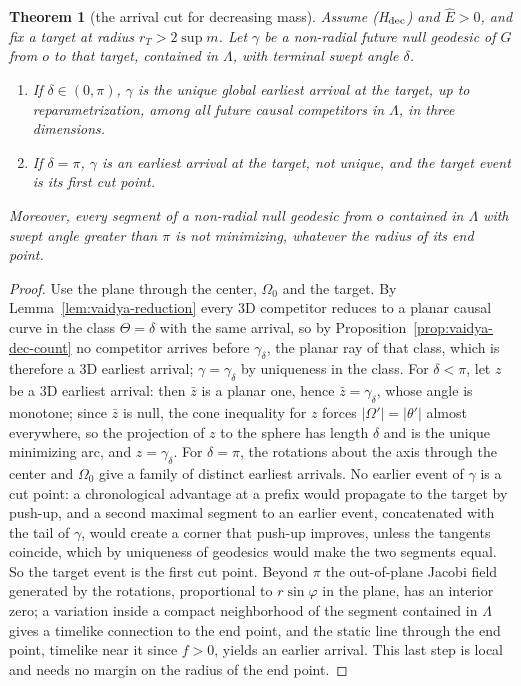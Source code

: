 \documentclass[aip,jmp,amsmath,amssymb,reprint]{revtex4-2}
\newcommand{\Ehat}{\hat E}
\theoremstyle{plain}
\newtheorem{theorem}{Theorem}
\theoremstyle{definition}
\begin{document}
\begin{theorem}[the arrival cut for decreasing mass]\label{thm:vaidya-dec}
Assume (H$_{\rm dec}$) and $\Ehat>0$, and fix a target at radius $r_T>2\sup m$. Let $\gamma$ be a non-radial future null
geodesic of $G$ from $o$ to that target, contained in $\Lambda$, with terminal swept angle $\delta$.
\begin{enumerate}
\item If $\delta\in(0,\pi)$, $\gamma$ is the unique global earliest arrival at the target, up to
  reparametrization, among all future causal competitors in $\Lambda$, in three dimensions.
\item If $\delta=\pi$, $\gamma$ is an earliest arrival at the target, not unique, and the target event is its
  first cut point.
\end{enumerate}
Moreover, every segment of a non-radial null geodesic from $o$ contained in $\Lambda$ with swept angle
greater than $\pi$ is not minimizing, whatever the radius of its end point.
\end{theorem}

\begin{proof}
Use the plane through the center, $\Omega_0$ and the target. By Lemma~\ref{lem:vaidya-reduction} every 3D competitor
reduces to a planar causal curve in the class $\Theta=\delta$ with the same arrival, so by
Proposition~\ref{prop:vaidya-dec-count} no competitor arrives before $\gamma_\delta$, the planar ray of that class,
which is therefore a 3D earliest arrival; $\gamma=\gamma_\delta$ by uniqueness in the class. For $\delta<\pi$, let $z$ be a 3D
earliest arrival: then $\bar z$ is a planar one, hence $\bar z=\gamma_\delta$, whose angle is monotone; since $\bar z$ is
null, the cone inequality for $z$ forces $|\Omega'|=|\theta'|$ almost everywhere, so the projection of $z$ to the
sphere has length $\delta$ and is the unique minimizing arc, and $z=\gamma_\delta$. For $\delta=\pi$, the rotations about
the axis through the center and $\Omega_0$ give a family of distinct earliest arrivals. No earlier event
of $\gamma$ is a cut point: a chronological advantage at a prefix would propagate to the target by
push-up, and a second maximal segment to an earlier event, concatenated with the tail of $\gamma$,
would create a corner that push-up improves, unless the tangents coincide, which by uniqueness
of geodesics would make the two segments equal. So the target event is the first cut point.
Beyond $\pi$ the out-of-plane Jacobi field generated by the rotations, proportional to $r\sin\varphi$ in the
plane, has an interior zero; a variation inside a compact neighborhood of the segment contained
in $\Lambda$ gives a timelike connection to the end point, and the static line through the end point,
timelike near it since $f>0$, yields an earlier arrival. This last step is local and needs no
margin on the radius of the end point.
\end{proof}
\end{document}
